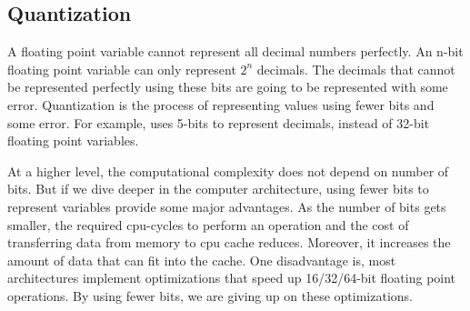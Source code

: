 \subsection{Quantization}
A floating point variable cannot represent all decimal numbers perfectly. An n-bit floating point variable can only represent $2^{n}$ decimals. The decimals that cannot be represented perfectly using these bits are going to be represented with some error. Quantization is the process of representing values using fewer bits and some error. For example, \cite{han2015deep} uses 5-bits to represent decimals, instead of 32-bit floating point variables.

At a higher level, the computational complexity does not depend on number of bits. But if we dive deeper in the computer architecture, using fewer bits to represent variables provide some major advantages. As the number of bits gets smaller, the required cpu-cycles to perform an operation and the cost of transferring data from memory to cpu cache reduces. Moreover, it increases the amount of data that can fit into the cache. One disadvantage is, most architectures implement optimizations that speed up 16/32/64-bit floating point operations. By using fewer bits, we are giving up on these optimizations.


